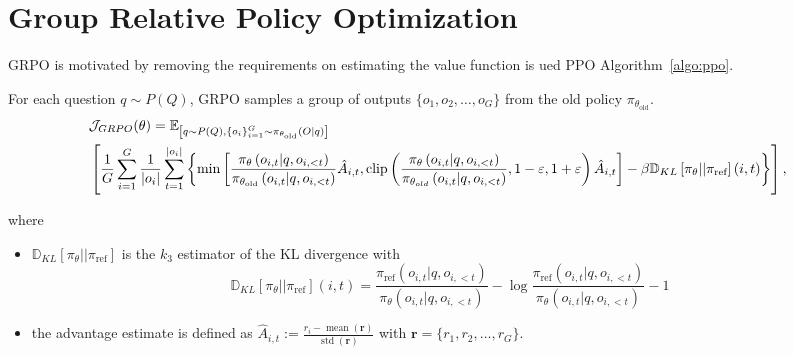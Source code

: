 \section{Group Relative Policy Optimization}

GRPO is motivated by removing the requirements on estimating the value function is ued PPO Algorithm~\ref{algo:ppo}.


For each question $q\sim P(Q)$, GRPO samples a group of outputs $\{o_1, o_2, \ldots, o_G\}$ from the old policy $\pi_{\theta_{\text{old}}}$.
\begin{align}
& {\cal J}_{GRPO}(\theta) \nonumber =\mathbb{E}_{\left[q \sim P(Q),\left\{o_i\right\}_{i=1}^G \sim \pi_{\theta_{\text{old}}}(O | q)\right]} \nonumber\\
& \left[\frac{1}{G} \sum_{i=1}^G \frac{1}{\left|o_i\right|} \sum_{t=1}^{\left|o_i\right|}\left\{ \min\left[\frac{\pi_\theta\left(o_{i, t} | q, o_{i,<t}\right)}{\pi_{\theta_{\text{old}}}\left(o_{i, t} | q, o_{i,<t}\right)}\hat{A}_{i, t}, \operatorname{clip}\left(\frac{\pi_\theta\left(o_{i, t} | q, o_{i,<t}\right)}{\pi_{\theta_{o l d}}\left(o_{i, t} | q, o_{i,<t}\right)}, 1-\varepsilon, 1+\varepsilon\right) \hat{A}_{i, t}\right]-\beta \mathbb{D}_{K L}\left[\pi_\theta| | \pi_{\text{ref}}\right](i,t)\right\}\right],
\end{align}

where
\begin{itemize}
    \item $\mathbb{D}_{KL}\left[\pi_\theta| | \pi_{\text{ref}}\right]$ is the $k_3$ estimator of the KL divergence with 
    $$ 
        \mathbb{D}_{K L}\left[\pi_\theta| | \pi_{\text{ref}}\right](i,t)=\frac{\pi_{\text{ref}}\left(o_{i, t} | q, o_{i,<t}\right)}{\pi_\theta\left(o_{i, t} | q, o_{i,<t}\right)}-\log \frac{\pi_{\text{ref}}\left(o_{i, t} | q, o_{i,<t}\right)}{\pi_\theta\left(o_{i, t} | q, o_{i,<t}\right)}-1
    $$
    \item the advantage estimate is defined as $\hat{A}_{i, t}:= \frac{r_i-\operatorname{mean}(\textbf{r})}{\operatorname{std}(\textbf{r})}$ with $\textbf{r}=\{r_1, r_2, \dots, r_G\}$.
\end{itemize}

